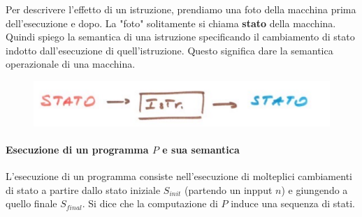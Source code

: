 \documentclass{article}
\begin{document}
Per descrivere l'effetto di un istruzione, prendiamo una foto della macchina prima dell'esecuzione
e dopo. La "foto" solitamente si chiama \textbf{stato} della macchina. Quindi spiego la semantica
di una istruzione specificando il cambiamento di stato indotto dall'esecuzione di quell'istruzione.
Questo significa dare la semantica operazionale di una macchina.
\begin{figure}[H]
    \centering
    \includegraphics[scale=0.5]{images/cambio_stato.png}
\end{figure}

\paragraph{Esecuzione di un programma $P$ e sua semantica}
L'esecuzione di un programma consiste nell'esecuzione di molteplici cambiamenti di stato a partire
dallo stato iniziale $S_{init}$ (partendo un inpput $n$)
e giungendo a quello finale $S_{final}$. Si dice che la computazione
di $P$ induce una sequenza di stati.
\end{document}
